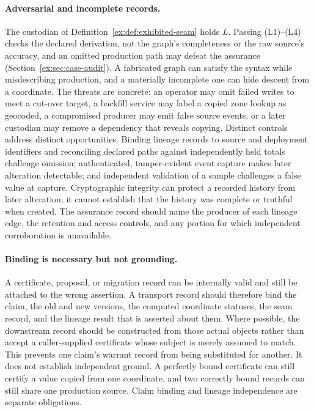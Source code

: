 \documentclass[11pt]{article}
\theoremstyle{definition}
\begin{document}
\paragraph{Adversarial and incomplete records.} The custodian of Definition~\ref{ex:def:exhibited-seam} holds $L$. Passing (L1)--(L4) checks the declared derivation, not the graph's completeness or the raw source's accuracy, and an omitted production path may defeat the assurance (Section~\ref{ex:sec:case-audit}). A fabricated graph can satisfy the syntax while misdescribing production, and a materially incomplete one can hide descent from a coordinate. The threats are concrete: an operator may omit failed writes to meet a cut-over target, a backfill service may label a copied zone lookup as geocoded, a compromised producer may emit false source events, or a later custodian may remove a dependency that reveals copying. Distinct controls address distinct opportunities. Binding lineage records to source and deployment identifiers and reconciling declared paths against independently held totals challenge omission; authenticated, tamper-evident event capture makes later alteration detectable; and independent validation of a sample challenges a false value at capture. Cryptographic integrity can protect a recorded history from later alteration; it cannot establish that the history was complete or truthful when created. The assurance record should name the producer of each lineage edge, the retention and access controls, and any portion for which independent corroboration is unavailable.

\paragraph{Binding is necessary but not grounding.}
A certificate, proposal, or migration record can be internally valid and still be attached to the wrong assertion. A transport record should therefore bind the claim, the old and new versions, the computed coordinate statuses, the seam record, and the lineage result that is asserted about them. Where possible, the downstream record should be constructed from those actual objects rather than accept a caller-supplied certificate whose subject is merely assumed to match. This prevents one claim's warrant record from being substituted for another. It does not establish independent ground. A perfectly bound certificate can still certify a value copied from one coordinate, and two correctly bound records can still share one production source. Claim binding and lineage independence are separate obligations.
\end{document}
